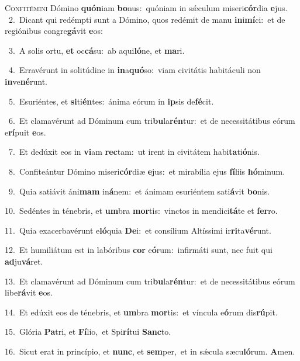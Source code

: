 \lettrine{\initial\textcolor{\initialcolor}{C}}{onfitémini} Dómino \textbf{quón}\-iam \textbf{bo}\-nus:~\star quóniam in sǽculum miseri\-\textbf{cór}\-dia \textbf{e}\-jus.\\
{\numbfont\textcolor{\numbcolor}{~2.}}~Dicant qui redémpti sunt a Dómino, quos redémit de manu \textbf{in}\-i\-\textbf{mí}\-ci:~\star et de regiónibus congre\-\textbf{gá}\-vit \textbf{e}\-os:\par
{\numbfont\textcolor{\numbcolor}{~3.}}~A solis ortu, \textbf{et} oc\-\textbf{cá}\-su:~\star ab aqui\-\textbf{ló}\-ne, et \textbf{ma}\-ri.\par
{\numbfont\textcolor{\numbcolor}{~4.}}~Erravérunt in solitúdine in \textbf{in}\-a\-\textbf{quó}\-so:~\star viam civitátis habitáculi non \textbf{in}\-ve\-\textbf{né}\-runt.\par
{\numbfont\textcolor{\numbcolor}{~5.}}~Esuriéntes, et \textbf{si}\-ti\-\textbf{én}\-tes:~\star ánima eórum in \textbf{ip}\-sis de\-\textbf{fé}\-cit.\par
{\numbfont\textcolor{\numbcolor}{~6.}}~Et clamavérunt ad Dóminum cum tri\-\textbf{bu}\-la\-\textbf{rén}\-tur:~\star et de necessitátibus eórum e\-\textbf{rí}\-puit \textbf{e}\-os.\par
{\numbfont\textcolor{\numbcolor}{~7.}}~Et dedúxit eos in \textbf{vi}\-am \textbf{rec}\-tam:~\star ut irent in civitátem habi\-\textbf{ta}\-ti\-\textbf{ó}\-nis.\par
{\numbfont\textcolor{\numbcolor}{~8.}}~Confiteántur Dómino miseri\-\textbf{cór}\-diæ \textbf{e}\-jus:~\star et mirabília ejus \textbf{fí}\-liis \textbf{hó}\-minum.\par
{\numbfont\textcolor{\numbcolor}{~9.}}~Quia satiávit áni\textbf{mam} in\-\textbf{á}\-nem:~\star et ánimam esuriéntem sati\-\textbf{á}\-vit \textbf{bo}\-nis.\par
{\numbfont\textcolor{\numbcolor}{10.}}~Sedéntes in ténebris, et \textbf{um}\-bra \textbf{mor}\-tis:~\star vinctos in mendici\-\textbf{tá}\-te et \textbf{fer}\-ro.\par
{\numbfont\textcolor{\numbcolor}{11.}}~Quia exacerbavérunt e\-\textbf{ló}\-quia \textbf{De}\-i:~\star et consílium Altíssimi ir\-\textbf{ri}\-ta\-\textbf{vé}\-runt.\par
{\numbfont\textcolor{\numbcolor}{12.}}~Et humiliátum est in labóribus \textbf{cor} e\-\textbf{ó}\-rum:~\star infirmáti sunt, nec fuit qui \textbf{ad}\-ju\-\textbf{vá}\-ret.\par
{\numbfont\textcolor{\numbcolor}{13.}}~Et clamavérunt ad Dóminum cum tri\-\textbf{bu}\-la\-\textbf{rén}\-tur:~\star et de necessitátibus eórum libe\-\textbf{rá}\-vit \textbf{e}\-os.\par
{\numbfont\textcolor{\numbcolor}{14.}}~Et edúxit eos de ténebris, et \textbf{um}\-bra \textbf{mor}\-tis:~\star et víncula e\-\textbf{ó}\-rum dis\-\textbf{rú}\-pit.\par
{\numbfont\textcolor{\numbcolor}{15.}}~Glória \textbf{Pa}\-tri, et \textbf{Fí}\-lio,~\star et Spi\-\textbf{rí}\-tui \textbf{Sanc}\-to.\par
{\numbfont\textcolor{\numbcolor}{16.}}~Sicut erat in princípio, et \textbf{nunc}\-, et \textbf{sem}\-per,~\star et in sǽcula sæcu\-\textbf{ló}\-rum. \textbf{A}\-men.\par
